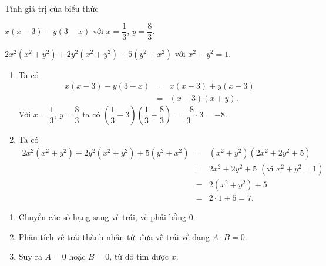 \begin{vd}
		Tính giá trị của biểu thức
	\begin{listEX}[1] 
		\item $x(x-3)-y(3-x) $ với $x=\dfrac{1}{3}$, $y=\dfrac{8}{3}$.
		\item $2x^2 \left( x^2 +y^2 \right) + 2y^2 \left( x^2 +y^2 \right) + 5 \left( y^2 +x^2 \right)   $ với $x^2 +y^2=1$.
	\end{listEX}
	\loigiai
	{
		\begin{enumerate}
			\item Ta có {\allowdisplaybreaks\begin{eqnarray*}
				x(x-3)-y(3-x) &=& x(x-3)+y(x-3)\\
				&=& (x-3)(x+y).
			\end{eqnarray*}}
			Với $x=\dfrac{1}{3}$, $y=\dfrac{8}{3}$ ta có $\left(\dfrac{1}{3} -3  \right) \left(\dfrac{1}{3} + \dfrac{8}{3} \right) = \dfrac{-8}{3} \cdot 3 = -8$.
			\item Ta có {\allowdisplaybreaks\begin{eqnarray*}
				2x^2 \left( x^2 +y^2 \right) + 2y^2 \left( x^2 +y^2 \right) + 5 \left( y^2 +x^2 \right) &=&  \left( x^2 +y^2 \right)  \left( 2x^2 +2y^2 +5 \right)\\
				&=& 2x^2 +2y^2 +5 \, \, (\text{vì } x^2 +y^2=1)\\
				&=& 2 \left( x^2 +y^2 \right) +5\\
				&=& 2\cdot1 +5 =7.
			\end{eqnarray*}}
		\end{enumerate}	
	}
\end{vd}

\begin{dang}[Tìm $x$]
	\begin{enumerate}[\tickEX]
		\item Chuyển các số hạng sang vế trái, vế phải bằng $0$.
		\item Phân tích vế trái thành nhân tử, đưa vế trái về dạng $A \cdot B=0$.
		\item Suy ra $A=0$ hoặc $B=0$, từ đó tìm được $x$.
	\end{enumerate}
\end{dang}


